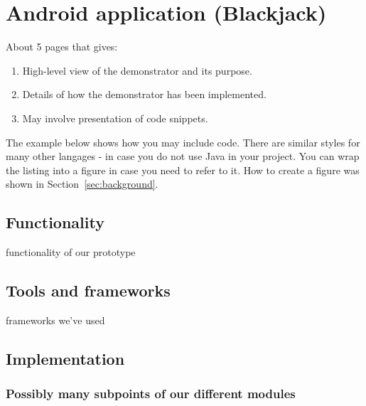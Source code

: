 \section{Android application (Blackjack)}
\label{sec:prototype}

About 5 pages that gives:

\begin{enumerate}
  
\item High-level view of the demonstrator and its purpose.

\item Details of how the demonstrator has been implemented.

\item May involve presentation of code snippets.

\end{enumerate}

The example below shows how you may include code. There are similar
styles for many other langages - in case you do not use Java in your
project. You can wrap the listing into a figure in case you need to
refer to it. How to create a figure was shown in Section~\ref{sec:background}.
  


\subsection{Functionality}
functionality of our prototype
 
\subsection{Tools and frameworks}
frameworks we've used
\subsection{Implementation}
\subsubsection{Possibly many subpoints of our different modules}
